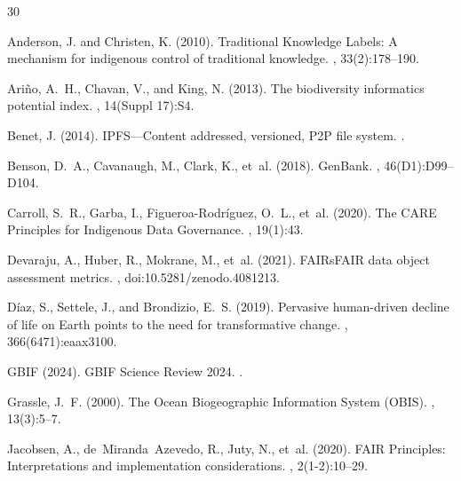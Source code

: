 \documentclass[11pt,a4paper]{article}
\begin{document}
\begin{thebibliography}{30}

Anderson, J. and Christen, K. (2010).
\newblock Traditional Knowledge Labels: A mechanism for indigenous control of traditional knowledge.
, 33(2):178--190.

Ari\~{n}o, A.~H., Chavan, V., and King, N. (2013).
\newblock The biodiversity informatics potential index.
, 14(Suppl 17):S4.

Benet, J. (2014).
\newblock IPFS---Content addressed, versioned, P2P file system.
.

Benson, D.~A., Cavanaugh, M., Clark, K., et~al. (2018).
\newblock GenBank.
, 46(D1):D99--D104.

Carroll, S.~R., Garba, I., Figueroa-Rodr\'{i}guez, O.~L., et~al. (2020).
\newblock The CARE Principles for Indigenous Data Governance.
, 19(1):43.

Devaraju, A., Huber, R., Mokrane, M., et~al. (2021).
\newblock FAIRsFAIR data object assessment metrics.
, doi:10.5281/zenodo.4081213.

D\'{i}az, S., Settele, J., and Brondizio, E.~S. (2019).
\newblock Pervasive human-driven decline of life on Earth points to the need for transformative change.
, 366(6471):eaax3100.

GBIF (2024).
\newblock GBIF Science Review 2024.
.

Grassle, J.~F. (2000).
\newblock The Ocean Biogeographic Information System (OBIS).
, 13(3):5--7.

Jacobsen, A., de~Miranda~Azevedo, R., Juty, N., et~al. (2020).
\newblock FAIR Principles: Interpretations and implementation considerations.
, 2(1-2):10--29.


\end{thebibliography}
\end{document}
